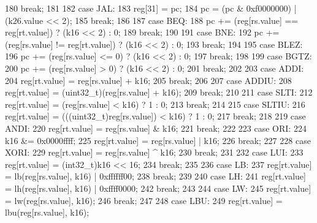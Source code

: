 \begin{DoxyCode}
{{180         \textcolor{keywordflow}{break};
181 
182     \textcolor{keywordflow}{case} JAL:
183         reg[31] = pc;
184         pc = (pc & 0xf0000000) | (k26.value << 2);
185         \textcolor{keywordflow}{break};
186 
187     \textcolor{keywordflow}{case} BEQ:
188         pc += (reg[rs.value] == reg[rt.value]) ? (k16 << 2) : 0;
189         \textcolor{keywordflow}{break};
190 
191     \textcolor{keywordflow}{case} BNE:
192         pc += (reg[rs.value] != reg[rt.value]) ? (k16 << 2) : 0;
193         \textcolor{keywordflow}{break};
194 
195     \textcolor{keywordflow}{case} BLEZ:
196         pc += (reg[rs.value] <= 0) ? (k16 << 2) : 0;
197         \textcolor{keywordflow}{break};
198 
199     \textcolor{keywordflow}{case} BGTZ:
200         pc += (reg[rs.value] > 0) ? (k16 << 2) : 0;
201         \textcolor{keywordflow}{break};
202 
203     \textcolor{keywordflow}{case} ADDI:
204         reg[rt.value] = reg[rs.value] + k16;
205         \textcolor{keywordflow}{break};
206 
207     \textcolor{keywordflow}{case} ADDIU:
208         reg[rt.value] = (uint32\_t)(reg[rs.value] + k16);
209         \textcolor{keywordflow}{break};
210 
211     \textcolor{keywordflow}{case} SLTI:
212         reg[rt.value] = (reg[rs.value] < k16) ? 1 : 0;
213         \textcolor{keywordflow}{break};
214 
215     \textcolor{keywordflow}{case} SLTIU:
216         reg[rt.value] = (((uint32\_t)reg[rs.value]) < k16) ? 1 : 0;
217         \textcolor{keywordflow}{break};
218 
219     \textcolor{keywordflow}{case} ANDI:
220         reg[rt.value] = reg[rs.value] & k16;
221         \textcolor{keywordflow}{break};
222 
223     \textcolor{keywordflow}{case} ORI:
224         k16 &= 0x0000ffff;
225         reg[rt.value] = reg[rs.value] | k16;
226         \textcolor{keywordflow}{break};
227 
228     \textcolor{keywordflow}{case} XORI:
229         reg[rt.value] = reg[rs.value] ^ k16;
230         \textcolor{keywordflow}{break};
231 
232     \textcolor{keywordflow}{case} LUI:
233         reg[rt.value] = (int32\_t)k16 << 16;
234         \textcolor{keywordflow}{break};
235 
236     \textcolor{keywordflow}{case} LB:
237         reg[rt.value] = lb(reg[rs.value], k16) | 0xffffff00;
238         \textcolor{keywordflow}{break};
239 
240     \textcolor{keywordflow}{case} LH:
241         reg[rt.value] = lh(reg[rs.value], k16) | 0xffff0000;
242         \textcolor{keywordflow}{break};
243 
244     \textcolor{keywordflow}{case} LW:
245         reg[rt.value] = lw(reg[rs.value], k16);
246         \textcolor{keywordflow}{break};
247 
248     \textcolor{keywordflow}{case} LBU:
249         reg[rt.value] = lbu(reg[rs.value], k16);
}}
\end{DoxyCode}
